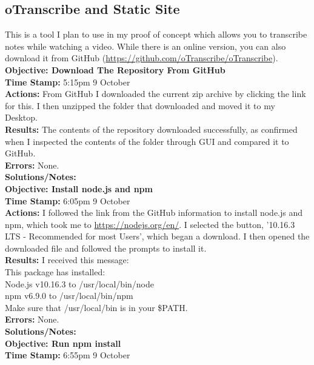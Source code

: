 \documentclass{article}
\begin{document}
\begin{FlushLeft}
\pagebreak

\subsection{oTranscribe and Static Site}
This is a tool I plan to use in my proof of concept which allows you to transcribe notes while watching a video. While there is an online version, you can also download it from GitHub (\url{https://github.com/oTranscribe/oTranscribe}).
\vspace{5mm}
\textbf{Objective: Download The Repository From GitHub}\\ 
\textbf{Time Stamp:} 5:15pm 9 October\\
\textbf{Actions:} From GitHub I downloaded the current zip archive by clicking the link for this. I then unzipped the folder that downloaded and moved it to my Desktop.\\
\textbf{Results:} The contents of the repository downloaded successfully, as confirmed when I inspected the contents of the folder through GUI and compared it to GitHub.\\
\textbf{Errors:} None.\\
\textbf{Solutions/Notes:}\\
\vspace{5mm}
\textbf{Objective: Install node.js and npm}\\ 
\textbf{Time Stamp:} 6:05pm 9 October\\
\textbf{Actions:} I followed the link from the GitHub information to install node.js and npm, which took me to \url{https://nodejs.org/en/}. I selected the button, '10.16.3 LTS - Recommended for most Users', which began a download. I then opened the downloaded file and followed the prompts to install it.\\
\textbf{Results:} I received this message:\\
This package has installed:\\
Node.js v10.16.3 to /usr/local/bin/node\\
npm v6.9.0 to /usr/local/bin/npm \\
Make sure that /usr/local/bin is in your \$PATH.\\
\textbf{Errors:} None.\\
\textbf{Solutions/Notes:}\\
\vspace{5mm}
\textbf{Objective: Run npm install}\\ 
\textbf{Time Stamp:} 6:55pm 9 October\\

\end{FlushLeft}
\end{document}

